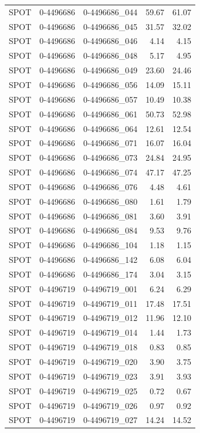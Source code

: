 \begin{tabular}{lllrr}
SPOT & 0-4496686 & 0-4496686_044 & 59.67 & 61.07 \\
SPOT & 0-4496686 & 0-4496686_045 & 31.57 & 32.02 \\
SPOT & 0-4496686 & 0-4496686_046 & 4.14 & 4.15 \\
SPOT & 0-4496686 & 0-4496686_048 & 5.17 & 4.95 \\
SPOT & 0-4496686 & 0-4496686_049 & 23.60 & 24.46 \\
SPOT & 0-4496686 & 0-4496686_056 & 14.09 & 15.11 \\
SPOT & 0-4496686 & 0-4496686_057 & 10.49 & 10.38 \\
SPOT & 0-4496686 & 0-4496686_061 & 50.73 & 52.98 \\
SPOT & 0-4496686 & 0-4496686_064 & 12.61 & 12.54 \\
SPOT & 0-4496686 & 0-4496686_071 & 16.07 & 16.04 \\
SPOT & 0-4496686 & 0-4496686_073 & 24.84 & 24.95 \\
SPOT & 0-4496686 & 0-4496686_074 & 47.17 & 47.25 \\
SPOT & 0-4496686 & 0-4496686_076 & 4.48 & 4.61 \\
SPOT & 0-4496686 & 0-4496686_080 & 1.61 & 1.79 \\
SPOT & 0-4496686 & 0-4496686_081 & 3.60 & 3.91 \\
SPOT & 0-4496686 & 0-4496686_084 & 9.53 & 9.76 \\
SPOT & 0-4496686 & 0-4496686_104 & 1.18 & 1.15 \\
SPOT & 0-4496686 & 0-4496686_142 & 6.08 & 6.04 \\
SPOT & 0-4496686 & 0-4496686_174 & 3.04 & 3.15 \\
SPOT & 0-4496719 & 0-4496719_001 & 6.24 & 6.29 \\
SPOT & 0-4496719 & 0-4496719_011 & 17.48 & 17.51 \\
SPOT & 0-4496719 & 0-4496719_012 & 11.96 & 12.10 \\
SPOT & 0-4496719 & 0-4496719_014 & 1.44 & 1.73 \\
SPOT & 0-4496719 & 0-4496719_018 & 0.83 & 0.85 \\
SPOT & 0-4496719 & 0-4496719_020 & 3.90 & 3.75 \\
SPOT & 0-4496719 & 0-4496719_023 & 3.91 & 3.93 \\
SPOT & 0-4496719 & 0-4496719_025 & 0.72 & 0.67 \\
SPOT & 0-4496719 & 0-4496719_026 & 0.97 & 0.92 \\
SPOT & 0-4496719 & 0-4496719_027 & 14.24 & 14.52 \\

\end{tabular}
